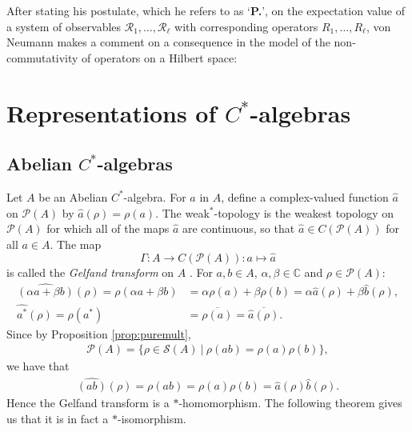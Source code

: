 \documentclass[12pt,a4paper]{report}
\theoremstyle{plain}
\theoremstyle{definition}
\newcommand{\1}{\mathbbm{1}}
\newcommand{\C}{\mathbb{C}}
\renewcommand{\S}{\mathscr{S}}
\renewcommand{\P}[1]{\mathscr{P}(#1)}
\begin{document}
After stating his postulate, which he refers to as `\textbf{P.}', on the expectation value of a system 
of observables $\mathscr{R_1},\dots,\mathscr{R_\ell}$ with corresponding operators $R_1,\dots, R_\ell$, 
von Neumann makes a comment on a consequence in the model of the non-commutativity of operators on a 
Hilbert space:




\chapter{Representations of $C^\ast$-algebras}
\section{Abelian $C^\ast$-algebras}\label{section:abelian}


Let $A$ be an Abelian $C^\ast$-algebra. For $a$ in $A$, define a complex-valued function $\hat{a}$ on
$\P{A}$ by $\hat{a}(\rho)= \rho(a)$. The weak$^\ast$-topology is the weakest topology on 
$\P{A}$ for which all of the maps $\hat{a}$ are continuous, so that $\hat{a} \in C(\P{A})$ for all 
$a\in A$. The map
\[
	\Gamma:A \to C(\P{A}) : a\mapsto \hat{a}
\]
is called the \emph{Gelfand transform} on $A$ \cite{davidson96}.
For $a,b \in A$, $\alpha,\beta\in\C$ and $\rho\in\P{A}$:
\begin{align*}
	\widehat{(\alpha a+\beta b)}(\rho) = \rho(\alpha a+\beta b) 
	&=	\alpha\rho(a) +\beta\rho(b) = \alpha\hat{a}(\rho)+ \beta\hat{b}(\rho), 	\\
	\widehat{a^\ast}(\rho) = \rho(a^\ast) &= \overline{\rho(a)} = \overline{\hat{a}(\rho)}.
\end{align*}
Since by Proposition \ref{prop:puremult},
\begin{align*}
	\P{A} = \{\rho \in \S(A) ~|~ \rho(ab) = \rho(a)\rho(b)\},
\end{align*}
we have that 
\begin{align*}
	\widehat{(ab)} (\rho)= \rho(ab) = \rho(a)\rho(b) = \hat{a}(\rho)\hat{b}(\rho).
\end{align*}
Hence the Gelfand transform is a $\ast$-homomorphism. The following theorem gives us that it is
in fact a $\ast$-isomorphism.
\end{document}
